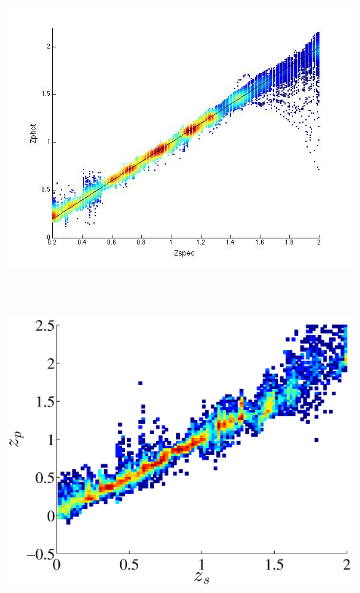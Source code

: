 \documentclass[useAMS,usenatbib,fleqn]{mn2e}
\begin{document}
\begin{figure}
        ~
        \begin{subfigure}[b]{0.24\textwidth}
                \includegraphics[width=\textwidth]{figures/23_J}
        \end{subfigure}
         ~
        \begin{subfigure}[b]{0.24\textwidth}
                \includegraphics[width=\textwidth]{figures/ANN_23}
        \end{subfigure}
        

\end{figure}
\end{document}
